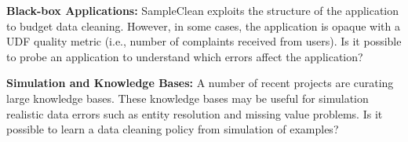 \vspace{0.5em}
\noindent \textbf{Black-box Applications: } SampleClean exploits the structure of the application to budget data cleaning. However, in some cases, the application is opaque with a UDF quality metric (i.e., number of complaints received from users). Is it possible to probe an application to understand which errors affect the application? 

\vspace{0.5em}
\noindent \textbf{Simulation and Knowledge Bases: } A number of recent projects are curating large knowledge bases. These knowledge bases may be useful for simulation realistic data errors such as entity resolution and missing value problems. Is it possible to learn a data cleaning policy from simulation of examples?


